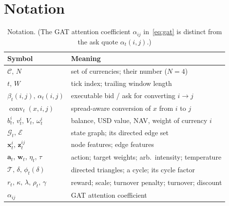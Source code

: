 \documentclass[12pt,a4paper]{article}
\begin{document}
\section{Notation}
\label{app:notation}
\begin{table}[h]
\centering
\caption{Notation. (The GAT attention coefficient $\alpha_{ij}$ in~\eqref{eq:gat} is distinct
from the ask quote $\alpha_t(i,j)$.)}
\begin{tabular}{ll}
\toprule
Symbol & Meaning \\
\midrule
$\mathcal{C},\,N$ & set of currencies; their number ($N=4$) \\
$t,\,W$ & tick index; trailing window length \\
$\beta_t(i,j),\,\alpha_t(i,j)$ & executable bid / ask for converting $i\to j$ \\
$\operatorname{conv}_t(x,i,j)$ & spread-aware conversion of $x$ from $i$ to $j$ \\
$b_t^i,\,v_t^i,\,V_t,\,\omega_t^i$ & balance, USD value, NAV, weight of currency $i$ \\
$\mathcal{G}_t,\,\mathcal{E}$ & state graph; its directed edge set \\
$\mathbf{x}_t^i,\,\mathbf{z}_t^{ij}$ & node features; edge features \\
$\mathbf{a}_t,\,\mathbf{w}_t,\,\eta_t,\,\tau$ & action; target weights; arb.\ intensity; temperature \\
$\mathcal{T},\,\delta,\,\phi_t(\delta)$ & directed triangles; a cycle; its cycle factor \\
$r_t,\,\kappa,\,\lambda,\,\rho_t,\,\gamma$ & reward; scale; turnover penalty; turnover; discount \\
$\alpha_{ij}$ & GAT attention coefficient \\
\bottomrule
\end{tabular}
\end{table}
\end{document}
